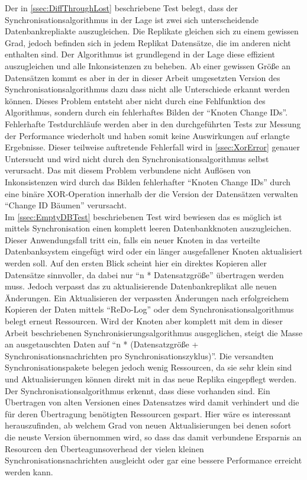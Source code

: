 \documentclass[a4paper,11pt,oneside,%
headsepline,												%
footsepline,												%
bibtotocnumbered									%
]{scrreprt}
\begin{document}
Der in \autoref{ssec:DiffThroughLost} beschriebene Test belegt, dass der Synchronisationsalgorithmus in der Lage ist zwei sich unterscheidende Datenbankrepliakte auszugleichen. Die Replikate gleichen sich zu einem gewissen Grad, jedoch befinden sich in jedem Replikat Datensätze, die im anderen nicht enthalten sind. Der Algorithmus ist grundlegend in der Lage diese effizient auszugleichen und alle Inkonsistenzen zu beheben. Ab einer gewissen Größe an Datensätzen kommt es aber in der in dieser Arbeit umgesetzten Version des Synchronisationsalgorithmus dazu dass nicht alle Unterschiede erkannt werden können. Dieses Problem entsteht aber nicht durch eine Fehlfunktion des Algorithmus, sondern durch ein fehlerhaftes Bilden der \enquote{Knoten Change IDs}. Fehlerhafte Testdurchläufe werden aber in den durchgeführten Tests zur Messung der Performance wiederholt und haben somit keine Auswirkungen auf erlangte Ergebnisse. Dieser teilweise auftretende Fehlerfall wird in \autoref{ssec:XorError}
genauer Untersucht und wird nicht durch den Synchronisationsalgorithmus selbst verursacht. Das mit diesem Problem verbundene nicht Auflösen von Inkonsistenzen wird durch das Bilden fehlerhafter \enquote{Knoten Change IDs} durch eine binäre XOR-Operation innerhalb der die Version der Datensätzen verwalten \enquote{Change ID Bäumen} verursacht.\\

Im \autoref{ssec:EmptyDBTest} beschriebenen Test wird bewiesen das es möglich ist mittels Synchronisation einen komplett leeren Datenbankknoten auszugleichen. Dieser Anwendungsfall tritt ein, falls ein neuer Knoten in das verteilte Datenbanksystem eingefügt wird oder ein länger ausgefallener Knoten aktualisiert werden soll. Auf den ersten Blick scheint hier ein direktes Kopieren aller Datensätze sinnvoller, da dabei nur \enquote{n * Datensatzgröße} übertragen werden muss. Jedoch verpasst das zu aktualisierende Datenbankreplikat alle neuen Änderungen. Ein Aktualisieren der verpassten Änderungen nach erfolgreichem Kopieren der Daten mittels \enquote{ReDo-Log} oder dem Synchronisationsalgorithmus belegt erneut Ressourcen. Wird der Knoten aber komplett mit dem in dieser Arbeit beschriebenen Synchronisierungsalgorithmus ausgeglichen, steigt die Masse an ausgetauschten Daten auf \enquote{n * (Datensatzgröße + Synchronisationsnachrichten pro Synchronisationszyklus)}. Die versandten Synchronisationspakete belegen jedoch wenig Ressourcen, da sie sehr klein sind und Aktualisierungen können direkt mit in das neue Replika eingepflegt werden. Der Synchronisationsalgorithmus erkennt, dass diese vorhanden sind. Ein Übertragen von alten Versionen eines Datensatzes wird damit verhindert und die für deren Übertragung benötigten Ressourcen gespart. Hier wäre es interessant herauszufinden, ab welchem Grad von neuen Aktualisierungen bei denen sofort die neuste Version übernommen wird, so dass das damit verbundene Ersparnis an Resourcen den Überteagunsoverhead der vielen kleinen Synchronisationsnachrichten ausgleicht oder gar eine bessere Performance erreicht werden kann. \\
\end{document}
